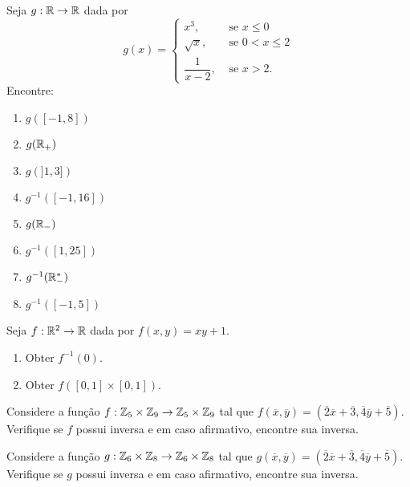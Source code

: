 \documentclass[12pt]{exam}
\begin{document}
\vspace{.3cm}

\questao{} Seja $g : \mathbb{R} \to \mathbb{R}$ dada por
\[
    g(x) = \begin{cases}
        x^3,& \mbox{ se } x \le 0\\
        \sqrt{x}, & \mbox{ se } 0 < x \le 2\\
        \dfrac{1}{x - 2}, & \mbox{ se } x > 2.
    \end{cases}
\]
Encontre:
\begin{multicols}{2}
    \begin{enumerate}[label={\alph*})]
        \item $g([-1,8])$
        \item $g(\mathbb{R}_+)$
        \item $g(]1, 3])$
        \item $g^{-1}([-1,16])$
        \item $g(\mathbb{R}_-)$
        \item $g^{-1}([1,25])$
        \item $g^{-1}(\mathbb{R}^*_-)$
        \item $g^{-1}([-1,5])$
    \end{enumerate}
\end{multicols}

\vspace{.3cm}

\questao{} Seja $f: \mathbb{R}^2 \to \mathbb{R}$ dada por $f(x,y) = xy + 1$.
\begin{enumerate}[label={\alph*})]
    \item Obter $f^{-1}({0})$.
    \item Obter $f([0,1]\times [0,1])$.
\end{enumerate}

\vspace{.3cm}


\questao{} Considere a fun{\c c}{\~a}o $f : \mathbb{Z}_5 \times \mathbb{Z}_9 \to \mathbb{Z}_5 \times \mathbb{Z}_9$ tal que $f(\overline{x},\overline{y}) = (\overline{2} \overline{x} + \overline{3}, \overline{4}\overline{y} + \overline{5})$. Verifique se $f$ possui inversa e em caso afirmativo, encontre sua inversa.

\vspace{.3cm}

\questao{} Considere a fun{\c c}{\~a}o $g : \mathbb{Z}_6 \times \mathbb{Z}_8 \to \mathbb{Z}_6 \times \mathbb{Z}_8$ tal que $g(\overline{x},\overline{y}) = (\overline{2} \overline{x} + \overline{3}, \overline{4}\overline{y} + \overline{5})$. Verifique se $g$ possui inversa e em caso afirmativo, encontre sua inversa.
\end{document}
